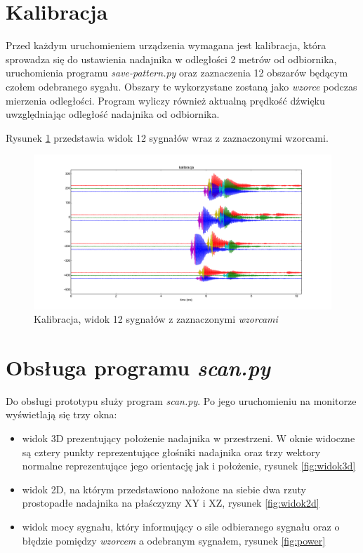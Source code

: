 \section{Kalibracja}

Przed każdym uruchomieniem urządzenia wymagana jest kalibracja,
która sprowadza się do ustawienia nadajnika w odległości 2 metrów od odbiornika,
uruchomienia programu \textit{save-pattern.py} oraz zaznaczenia  12 obszarów  będącym czołem odebranego sygału.
Obszary te wykorzystane zostaną jako \textit{wzorce} podczas mierzenia odległości.
Program wyliczy również aktualną prędkość dźwięku uwzględniając odległość nadajnika od odbiornika.

Rysunek \ref{fig:kalibracja_12x} przedstawia widok 12 sygnałów wraz z zaznaczonymi wzorcami.


 \begin{figure}[h!]
    \centering
    \includegraphics[width=1.12\textwidth, trim= 46mm 0mm 0mm 0mm,clip]{kalibracja_12x}
    \caption{Kalibracja, widok 12 sygnałów z zaznaczonymi \textit{wzorcami}}
    \label{fig:kalibracja_12x}
\end{figure}

\newpage

\section{Obsługa programu \textit{scan.py}}

Do obsługi prototypu służy program \textit{scan.py}. Po jego uruchomieniu 
na monitorze wyświetlają się trzy okna: 
\begin{itemize}
 \item widok 3D prezentujący położenie nadajnika w przestrzeni. W oknie widoczne są  
 cztery punkty reprezentujące głośniki nadajnika oraz trzy wektory normalne reprezentujące 
jego orientację jak i położenie, rysunek \ref{fig:widok3d}
 \item widok 2D, na którym przedstawiono nałożone na siebie dwa rzuty prostopadłe nadajnika na płaśczyzny XY i XZ, rysunek \ref{fig:widok2d}
 \item widok mocy sygnału, który informujący o sile odbieranego sygnału oraz o błędzie pomiędzy \textit{wzorcem} a odebranym sygnałem, rysunek \ref{fig:power}
\end{itemize}

